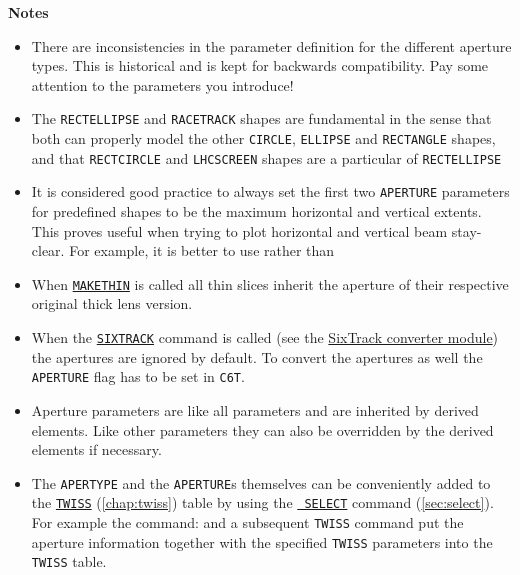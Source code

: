 {\bf Notes}
\begin{itemize}
   \item There are inconsistencies in the parameter definition for the
     different aperture types. This is historical and is kept for
     backwards compatibility. Pay some attention to the parameters you
     introduce! 


	\item The {\tt RECTELLIPSE}  and {\tt RACETRACK} shapes are fundamental 
	in the sense that both can properly model the other {\tt CIRCLE}, 
	{\tt ELLIPSE} and {\tt RECTANGLE} shapes, and that {\tt RECTCIRCLE} 
	and {\tt LHCSCREEN} shapes are a particular of {\tt RECTELLIPSE}

	\item It is considered good practice to always set the first two 
	{\tt APERTURE} parameters for predefined shapes to be the maximum
	horizontal and vertical extents. This proves useful when trying to 
	plot horizontal and vertical beam stay-clear. 
	For example, it is better to use
	rather than

   \item When \hyperref[chap:makethin]{\tt MAKETHIN} is called all
     thin slices inherit the aperture of their respective original thick
     lens version.  

   \item When the \hyperref[chap:sixtrack]{\tt SIXTRACK} command is called (see the
     \hyperref[chap:sixtrack]{SixTrack converter module}) the apertures are
     ignored by default. To convert the apertures as well the {\tt APERTURE}
     flag has to be set in {\tt C6T}.  

   \item  Aperture parameters are like all parameters and are inherited
     by derived elements. Like other parameters they can also be overridden by
     the derived elements if necessary.  

   \item The {\tt APERTYPE} and the {\tt APERTURE}s themselves can be
     conveniently added to the \hyperref[chap:twiss]{\texttt{TWISS}} 
     (\autoref{chap:twiss}) table by using the \hyperref[sec:select]{\tt 
     SELECT} command (\autoref{sec:select}). For example the command:    
     and a subsequent {\tt TWISS} command put the aperture information together 
     with the specified {\tt TWISS} parameters into the {\tt TWISS} table.


\end{itemize}
